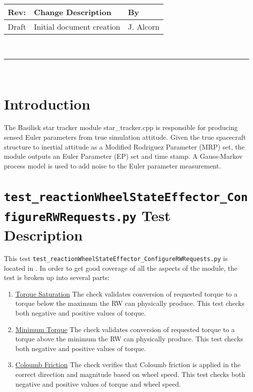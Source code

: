 \documentclass[]{BasiliskReportMemo}
\begin{document}
\makeCover


%
%
\pagestyle{empty}
{\renewcommand{\arraystretch}{1.1}
\noindent
\begin{longtable}{|p{0.5in}|p{4.5in}|p{1.14in}|}
\hline
{\bfseries Rev}: & {\bfseries Change Description} & {\bfseries By} \\
\hline
Draft & Initial document creation & J. Alcorn \\
\hline

\end{longtable}
}

\newpage
\setcounter{page}{1}
\pagestyle{fancy}

\tableofcontents
~\\ \hrule ~\\


\section{Introduction}
The Basilisk star tracker module star\_tracker.cpp is responsible for producing sensed Euler parameters from true simulation attitude. Given the true spacecraft structure to inertial attitude as a Modified Rodriguez Parameter (MRP) set, the module outputs an Euler Parameter (EP) set and time stamp. A Gauss-Markov process model is used to add noise to the Euler parameter measurement.

\section{{\tt test\_reactionWheelStateEffector\_ConfigureRWRequests.py} Test Description}

This test {\tt test\_reactionWheelStateEffector\_ConfigureRWRequests.py} is located in . In order to get good coverage of all the aspects of the module, the test is broken up into several parts: \par

\begin{enumerate}
	\item \underline{Torque Saturation} The check validates conversion of requested torque to a torque below the maximum the RW can physically produce. This test checks both negative and positive values of torque.
	\item \underline{Minimum Torque} The check validates conversion of requested torque to a torque above the minimum the RW can physically produce. This test checks both negative and positive values of torque.
	\item \underline{Coloumb Friction} The check verifies that Coloumb friction is applied in the correct direction and magnitude based on wheel speed.  This test checks both negative and positive values of torque and wheel speed.
\end{enumerate} 
\end{document}

